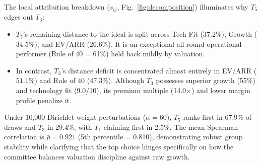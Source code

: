 \documentclass[conference]{IEEEtran}
\begin{document}
\begin{table}[t]
\centering
\caption{AHP Weights, TOPSIS Scores, and Stability Metrics}
\label{tab:topsis_results}
\end{table}

The local attribution breakdown ($s_{ij}$, Fig.~\ref{fig:decomposition}) illuminates why $T_5$ edges out $T_3$:
\begin{itemize}
    \item $T_5$'s remaining distance to the ideal is split across Tech Fit ($37.2\%$), Growth ($34.5\%$), and EV/ARR ($26.6\%$). It is an exceptional all-round operational performer (Rule of 40 = 61\%) held back mildly by valuation.
    \item In contrast, $T_3$'s distance deficit is concentrated almost entirely in EV/ARR ($51.1\%$) and Rule of 40 ($47.3\%$). Although $T_3$ possesses superior growth (55\%) and technology fit (9.0/10), its premium multiple (14.0$\times$) and lower margin profile penalize it.
\end{itemize}

Under 10,000 Dirichlet weight perturbations ($\alpha = 60$), $T_5$ ranks first in 67.9\% of draws and $T_3$ in 29.4\%, with $T_1$ claiming first in 2.5\%. The mean Spearman correlation is $\bar{\rho} = 0.921$ (5th percentile = 0.810), demonstrating robust group stability while clarifying that the top choice hinges specifically on how the committee balances valuation discipline against raw growth.
\end{document}
